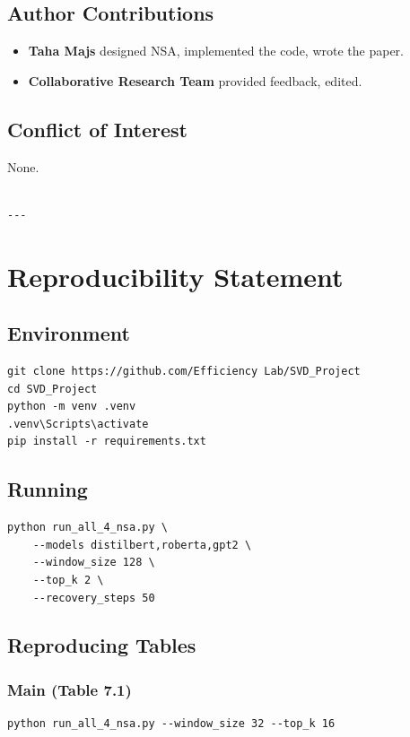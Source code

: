\subsection{Author Contributions}

\begin{itemize}
\item \textbf{Taha Majs} designed NSA, implemented the code, wrote the paper.
\item \textbf{Collaborative Research Team} provided feedback, edited.

\end{itemize}
\subsection{Conflict of Interest}

None.
\begin{lstlisting}

---
\end{lstlisting}


\section{Reproducibility Statement}

\subsection{Environment}

\begin{lstlisting}
git clone https://github.com/Efficiency Lab/SVD_Project
cd SVD_Project
python -m venv .venv
.venv\Scripts\activate
pip install -r requirements.txt
\end{lstlisting}

\subsection{Running}

\begin{lstlisting}
python run_all_4_nsa.py \
    --models distilbert,roberta,gpt2 \
    --window_size 128 \
    --top_k 2 \
    --recovery_steps 50
\end{lstlisting}

\subsection{Reproducing Tables}

\subsubsection{Main (Table 7.1)}
\begin{lstlisting}
python run_all_4_nsa.py --window_size 32 --top_k 16
\end{lstlisting}

